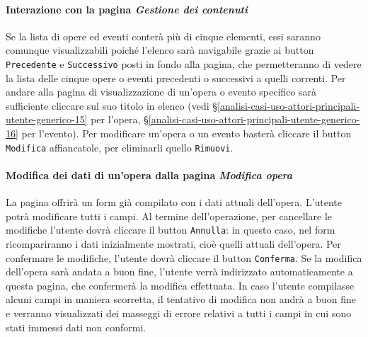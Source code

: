 \paragraph{Interazione con la pagina \textit{Gestione dei contenuti}}
\label{analisi-casi-uso-attori-principali-utente-amministratore-9}
Se la lista di opere ed eventi conterà più di cinque elementi, essi saranno comunque visualizzabili poiché l'elenco sarà navigabile grazie ai button \texttt{Precedente} e \texttt{Successivo} posti in fondo alla pagina, che permetteranno di vedere la lista delle cinque opere o eventi precedenti o successivi a quelli correnti. Per andare alla pagina di visualizzazione di un'opera o evento specifico sarà sufficiente cliccare sul suo titolo in elenco (vedi §\ref{analisi-casi-uso-attori-principali-utente-generico-15} per l'opera, §\ref{analisi-casi-uso-attori-principali-utente-generico-16} per l'evento). Per modificare un'opera o un evento basterà cliccare il button \texttt{Modifica} affiancatole, per eliminarli quello \texttt{Rimuovi}.



\paragraph{Modifica dei dati di un'opera dalla pagina \textit{Modifica opera}}
\label{analisi-casi-uso-attori-principali-utente-amministratore-10}
La pagina offrirà un form già compilato con i dati attuali dell'opera. L'utente potrà modificare tutti i campi. Al termine dell'operazione, per cancellare le modifiche l'utente dovrà cliccare il button \texttt{Annulla}: in questo caso, nel form ricompariranno i dati inizialmente mostrati, cioè quelli attuali dell'opera. Per confermare le modifiche, l'utente dovrà cliccare il button \texttt{Conferma}. Se la modifica dell'opera sarà andata a buon fine, l'utente verrà indirizzato automaticamente a questa pagina, che confermerà la modifica effettuata. In caso l'utente compilasse alcuni campi in maniera scorretta, il tentativo di modifica non andrà a buon fine e verranno visualizzati dei masseggi di errore relativi a tutti i campi in cui sono stati immessi dati non conformi.

%


